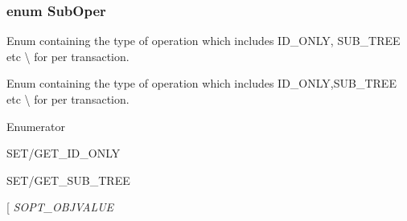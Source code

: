 \hypertarget{group__LIBHELP_ga26a2d765c9669d7cf62818f31a306f76}{
\subsubsection[{Sub\-Oper}]{\setlength{\rightskip}{0pt plus 5cm}enum {\bf Sub\-Oper}}}\label{group__LIBHELP_ga26a2d765c9669d7cf62818f31a306f76}


Enum containing the type of operation which includes I\-D\-\_\-\-O\-N\-L\-Y, S\-U\-B\-\_\-\-T\-R\-E\-E etc \textbackslash{} for per transaction. 

Enum containing the type of operation which includes I\-D\-\_\-\-O\-N\-L\-Y,S\-U\-B\-\_\-\-T\-R\-E\-E etc \textbackslash{} for per transaction. \begin{Desc}
\item[Enumerator]\par
\begin{description}
\item[{\em 
\hypertarget{group__LIBHELP_gga26a2d765c9669d7cf62818f31a306f76a86ca54869a37d6b2ee9f1ef03f18d7bd}{S\-O\-P\-T\-\_\-\-I\-D}\label{group__LIBHELP_gga26a2d765c9669d7cf62818f31a306f76a86ca54869a37d6b2ee9f1ef03f18d7bd}
}]S\-E\-T/\-G\-E\-T\-\_\-\-I\-D\-\_\-\-O\-N\-L\-Y \item[{\em 
\hypertarget{group__LIBHELP_gga26a2d765c9669d7cf62818f31a306f76a590689005d14f4443e685b735a0fb598}{S\-O\-P\-T\-\_\-\-O\-B\-J\-N\-A\-M\-E}\label{group__LIBHELP_gga26a2d765c9669d7cf62818f31a306f76a590689005d14f4443e685b735a0fb598}
}]S\-E\-T/\-G\-E\-T\-\_\-\-S\-U\-B\-\_\-\-T\-R\-E\-E \item[{\em 
\hypertarget{group__LIBHELP_gga26a2d765c9669d7cf62818f31a306f76a509d34676cdc189cd6db36c8f31df9c0}{S\-O\-P\-T\-\_\-\-O\-B\-J\-V\-A\-L\-U\-E}\label{group__LIBHELP_gga26a2d765c9669d7cf62818f31a306f76a509d34676cdc189cd6db36c8f31df9c0}
}
\end{description}
\end{Desc}
